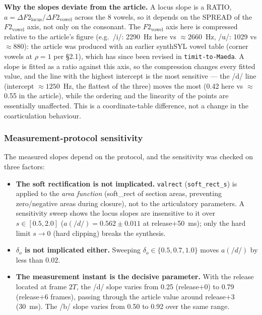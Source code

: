 \documentclass[11pt,a4paper]{article}
\begin{document}
\textbf{Why the slopes deviate from the article.} A locus slope is a
RATIO, $a = \Delta F2_{\text{locus}} / \Delta F2_{\text{vowel}}$
across the 8 vowels, so it depends on the SPREAD of the
$F2_{\text{vowel}}$ axis, not only on the consonant. The
$F2_{\text{vowel}}$ axis here is compressed relative to the article's
figure (e.g.\ /i/: 2290~Hz here vs $\approx$2660~Hz, /u/: 1029 vs
$\approx$880): the article was produced with an earlier synthSYL
vowel table (corner vowels at $\rho = 1$ per \S2.1), which has since
been revised in \texttt{timit-to-Maeda}. A slope is fitted as a ratio
against this axis, so the compression changes every fitted value, and
the line with the highest intercept is the most sensitive --- the
/d/ line (intercept $\approx 1250$~Hz, the flattest of the three)
moves the most (0.42 here vs $\approx$0.55 in the article), while the
ordering and the linearity of the points are essentially unaffected.
This is a coordinate-table difference, not a change in the
coarticulation behaviour.

\subsubsection{Measurement-protocol sensitivity}

The measured slopes depend on the protocol, and the sensitivity was
checked on three factors:

\begin{itemize}
\item \textbf{The soft rectification is not implicated.}
  \texttt{valrect} (\texttt{soft\_rect\_s}) is applied to the
  \emph{area function} (soft\_rect of section areas, preventing
  zero/negative areas during closure), not to the articulatory
  parameters. A sensitivity sweep shows the locus slopes are
  insensitive to it over $s \in [0.5, 2.0]$
  ($a(/d/) = 0.562 \pm 0.011$ at release$+$50~ms); only the hard
  limit $s \to 0$ (hard clipping) breaks the synthesis.
\item \textbf{$\delta_o$ is not implicated either.} Sweeping
  $\delta_o \in \{0.5, 0.7, 1.0\}$ moves $a(/d/) $ by less than
  $0.02$.
\item \textbf{The measurement instant is the decisive parameter.}
  With the release located at frame $2T$, the /d/ slope varies from
  0.25 (release$+$0) to 0.79 (release$+$6 frames), passing through
  the article value around release$+$3 (30~ms). The /b/ slope varies
  from 0.50 to 0.92 over the same range.
\end{itemize}
\end{document}
